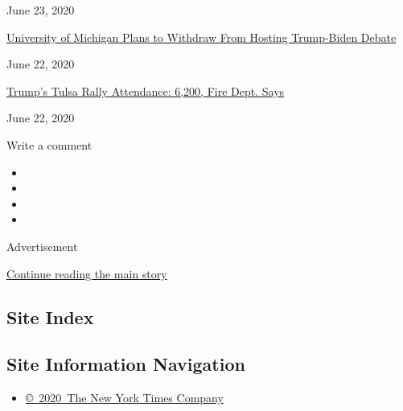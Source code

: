 June 23, 2020

\href{https://www.nytimes3xbfgragh.onion/2020/06/22/us/politics/trump-vs-biden-presidential-debates.html}{University
of Michigan Plans to Withdraw From Hosting Trump-Biden Debate}

June 22, 2020

\href{https://www.nytimes3xbfgragh.onion/2020/06/22/us/politics/trump-rally-coronavirus.html}{Trump's
Tulsa Rally Attendance: 6,200, Fire Dept. Says}

June 22, 2020

Write a comment

\begin{itemize}
\item
\item
\item
\item
\end{itemize}

Advertisement

\protect\hyperlink{after-bottom}{Continue reading the main story}

\hypertarget{site-index}{%
\subsection{Site Index}\label{site-index}}

\hypertarget{site-information-navigation}{%
\subsection{Site Information
Navigation}\label{site-information-navigation}}

\begin{itemize}
\tightlist
\item
  \href{https://help.nytimes3xbfgragh.onion/hc/en-us/articles/115014792127-Copyright-notice}{©~2020~The
  New York Times Company}
\end{itemize}


